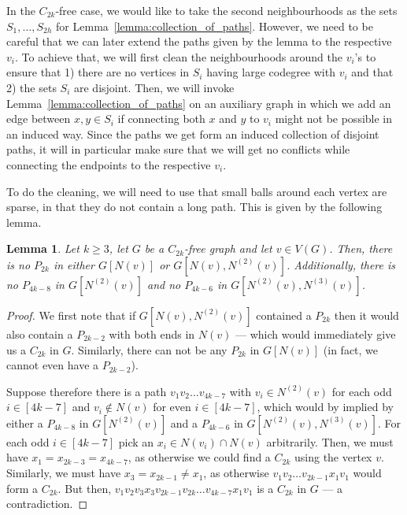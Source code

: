 \documentclass[10pt, a4paper]{article}
\numberwithin{theorem}{section} %
\newtheorem{lemma}[theorem]{Lemma}
\theoremstyle{remark}
\theoremstyle{definition}
\begin{document}
In the $C_{2k}$-free case, we would like to take the second neighbourhoods as the sets $S_1, \dots, S_{2h}$ for Lemma~\ref{lemma:collection_of_paths}.
However, we need to be careful that we can later extend the paths given by the lemma to the respective $v_i$.
To achieve that, we will first clean the neighbourhoods around the $v_i$'s to ensure that 1) there are no vertices in $S_i$ having large codegree with $v_i$ and that 2) the sets $S_i$ are disjoint.
Then, we will invoke Lemma~\ref{lemma:collection_of_paths} on an auxiliary graph in which we add an edge between $x, y \in S_i$ if connecting both $x$ and $y$ to $v_i$ might not be possible in an induced way.
Since the paths we get form an induced collection of disjoint paths, it will in particular make sure that we will get no conflicts while connecting the endpoints to the respective $v_i$.

To do the cleaning, we will need to use that small balls around each vertex are sparse, in that they do not contain a long path. This is given by the following lemma.
\begin{lemma}\label{lemma:no_long_path}
    Let $k \geq 3$, let $G$ be a $C_{2k}$-free graph and let $v \in V(G)$.
    Then, there is no $P_{2k}$ in either $G[N(v)]$ or $G[N(v),N^{(2)}(v)]$. Additionally, there is no $P_{4k-8}$ in $G[N^{(2)}(v)]$ and no $P_{4k-6}$ in $G[N^{(2)}(v), N^{(3)}(v)]$.
\end{lemma}
\begin{proof}
    We first note that if $G[N(v), N^{(2)}(v)]$ contained a $P_{2k}$ then it would also contain a $P_{2k-2}$ with both ends in $N(v)$ --- which would immediately give us a $C_{2k}$ in $G$. Similarly, there can not be any $P_{2k}$ in $G[N(v)]$ (in fact, we cannot even have a $P_{2k-2}$).

    Suppose therefore there is a path $v_1v_2\dots v_{4k-7}$ with $v_i \in N^{(2)}(v)$ for each odd $i \in [4k-7]$ and $v_i\not\in N(v)$ for even $i\in [4k-7]$, which would by implied by either a $P_{4k-8}$ in $G[N^{(2)}(v)]$ and a $P_{4k-6}$ in $G[N^{(2)}(v), N^{(3)}(v)]$.
    For each odd $i \in [4k-7]$ pick an $x_i \in N(v_i) \cap N(v)$ arbitrarily.
    Then, we must have $x_1 = x_{2k-3} = x_{4k-7}$, as otherwise we could find a $C_{2k}$ using the vertex $v$.
    Similarly, we must have $x_{3} = x_{2k-1} \neq x_1$, as otherwise $v_1v_2\dots v_{2k-1}x_1v_1$ would form a $C_{2k}$.
    But then, $v_1v_2v_3x_3v_{2k-1}v_{2k}\dots v_{4k-7}x_1v_1$ is a $C_{2k}$ in $G$ --- a contradiction.
\end{proof}
\end{document}

